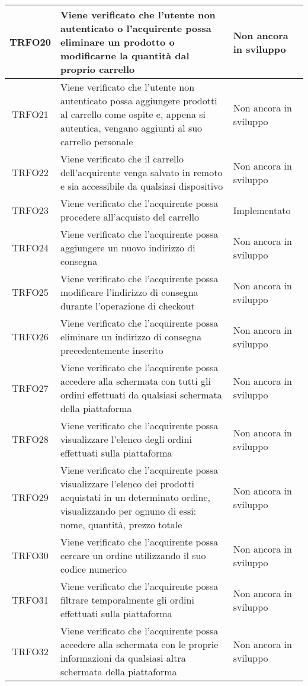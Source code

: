 \begin{longtable}{|c| C{10cm} |C{3cm}|}
    	TRFO20 & Viene verificato che l'utente non autenticato o l'acquirente possa eliminare un prodotto o modificarne la quantità dal proprio carrello & Non ancora in sviluppo\\ \hline
	TRFO21 & Viene verificato che l'utente non autenticato possa aggiungere prodotti al carrello come ospite e, appena si autentica, vengano aggiunti al suo carrello personale & Non ancora in sviluppo\\ \hline
	TRFO22 & Viene verificato che il carrello dell'acquirente venga salvato in remoto e sia accessibile da qualsiasi dispositivo & Non ancora in sviluppo\\ \hline
   	TRFO23 & Viene verificato che l'acquirente possa procedere all'acquisto del carrello & Implementato\\ \hline
   	TRFO24 & Viene verificato che l'acquirente possa aggiungere un nuovo indirizzo di consegna & Non ancora in sviluppo\\ \hline
   	TRFO25 & Viene verificato che l'acquirente possa modificare l'indirizzo di consegna durante l'operazione di checkout & Non ancora in sviluppo\\ \hline
	TRFO26 & Viene verificato che l'acquirente possa eliminare un indirizzo di consegna precedentemente inserito & Non ancora in sviluppo\\ \hline
	TRFO27 & Viene verificato che l'acquirente possa accedere alla schermata con tutti gli ordini effettuati da qualsiasi schermata della piattaforma & Non ancora in sviluppo \\ \hline
	TRFO28 & Viene verificato che l'acquirente possa visualizzare l'elenco degli ordini effettuati sulla piattaforma & Non ancora in sviluppo\\ \hline
	TRFO29 & Viene verificato che l'acquirente possa visualizzare l'elenco dei prodotti acquistati in un determinato ordine, visualizzando per ognuno di essi: nome, quantità, prezzo totale & Non ancora in sviluppo\\ \hline
	TRFO30 & Viene verificato che l'acquirente possa cercare un ordine utilizzando il suo codice numerico & Non ancora in sviluppo\\ \hline
	TRFO31 & Viene verificato che l'acquirente possa filtrare temporalmente gli ordini effettuati sulla piattaforma & Non ancora in sviluppo\\ \hline
	TRFO32 & Viene verificato che l'acquirente possa accedere alla schermata con le proprie informazioni da qualsiasi altra schermata della piattaforma & Non ancora in sviluppo\\ \hline

\end{longtable}
